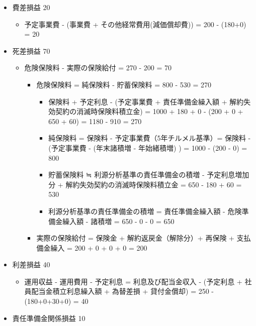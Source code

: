 \documentclass[report,gutter=10mm,fore-edge=10mm,uplatex,dvipdfmx]{jlreq}
\begin{document}
\begin{itemize}
\tightlist
\item
  費差損益 20

  \begin{itemize}
  \tightlist
  \item
    予定事業費 - (事業費 + その他経常費用(減価償却費)) = 200 - (180+0) =
    20
  \end{itemize}
\item
  死差損益 70

  \begin{itemize}
  \tightlist
  \item
    危険保険料 - 実際の保険給付 = 270 - 200 = 70

    \begin{itemize}
    \tightlist
    \item
      危険保険料 = 純保険料 - 貯蓄保険料 = 800 - 530 = 270

      \begin{itemize}
      \tightlist
      \item
        保険料 + 予定利息 - (予定事業費 + 責任準備金繰入額 +
        解約失効契約の消滅時保険料積立金) = 1000 + 180 + 0 - (200 + 0 +
        650 + 60) = 1180 - 910 = 270
        \item
          純保険料 = 保険料 - 予定事業費（5年チルメル基準）= 保険料 -
          (予定事業費 - (年末諸積増 - 年始緒積増) ) = 1000 - (200 - 0) =
          800
        \item
          貯蓄保険料 ≒ 利源分析基準の責任準備金の積増 - 予定利息増加分 +
          解約失効契約の消滅時保険料積立金 = 650 - 180 + 60 = 530
        \item
          利源分析基準の責任準備金の積増 = 責任準備金繰入額 -
          危険準備金繰入額 - 諸積増 = 650 - 0 - 0 = 650
      \end{itemize}
    \item
      実際の保険給付 = 保険金 + 解約返戻金（解除分）+ 再保険 +
      支払備金繰入 = 200 + 0 + 0 + 0 = 200
    \end{itemize}
  \end{itemize}
\item
  利差損益 40

  \begin{itemize}
  \tightlist
  \item
    運用収益 - 運用費用 - 予定利息 = 利息及び配当金収入 - (予定利息 +
    社員配当金積立利息繰入額 + 為替差損 + 貸付金償却) = 250 -
    (180+0+30+0) = 40
  \end{itemize}
\item
  責任準備金関係損益 10


\end{itemize}
\end{document}
